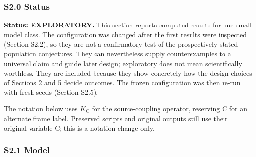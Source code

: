 \documentclass[
  10pt,
  a4paper,
]{article}
\begin{document}
\subsubsection{S2.0 Status}\label{s2.0-status}

\textbf{Status: EXPLORATORY.} This section reports computed results for
one small model class. The configuration was changed after the first
results were inspected (Section S2.2), so they are not a confirmatory
test of the prospectively stated population conjectures. They can
nevertheless supply counterexamples to a universal claim and guide later
design; exploratory does not mean scientifically worthless. They are
included because they show concretely how the design choices of Sections
2 and 5 decide outcomes. The frozen configuration was then re-run with
fresh seeds (Section S2.5).

The notation below uses \(K_{\mathrm C}\) for the source-coupling
operator, reserving C for an alternate frame label. Preserved scripts
and original outputs still use their original variable C; this is a
notation change only.

\subsubsection{S2.1 Model}\label{s2.1-model}
\end{document}
